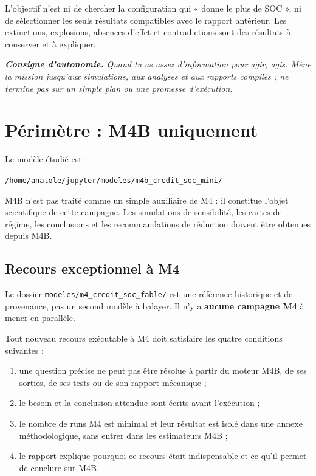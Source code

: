 \documentclass[11pt,a4paper]{article}
\newcommand{\file}[1]{\nolinkurl{#1}}
\newcommand{\term}[1]{\textbf{\color{navy}#1}}
\newenvironment{notebox}
  {\begin{center}\begin{minipage}{0.90\textwidth}\color{navy}\itshape}
  {\end{minipage}\end{center}}
\begin{document}
L'objectif n'est ni de chercher la configuration qui « donne le plus de SOC »,
ni de sélectionner les seuls résultats compatibles avec le rapport antérieur.
Les extinctions, explosions, absences d'effet et contradictions sont des
résultats à conserver et à expliquer.

\begin{notebox}
\textbf{Consigne d'autonomie.} Quand tu as assez d'information pour agir,
agis. Mène la mission jusqu'aux simulations, aux analyses et aux rapports
compilés ; ne termine pas sur un simple plan ou une promesse d'exécution.
\end{notebox}

\section{Périmètre : M4B uniquement}

Le modèle étudié est :

\begin{center}
  \file{/home/anatole/jupyter/modeles/m4b_credit_soc_mini/}
\end{center}

M4B n'est pas traité comme un simple auxiliaire de M4 : il constitue l'objet
scientifique de cette campagne. Les simulations de sensibilité, les cartes de
régime, les conclusions et les recommandations de réduction doivent être
obtenues depuis M4B.

\subsection{Recours exceptionnel à M4}

Le dossier \file{modeles/m4_credit_soc_fable/} est une référence historique et de
provenance, pas un second modèle à balayer. Il n'y a \term{aucune campagne M4}
à mener en parallèle.

Tout nouveau recours exécutable à M4 doit satisfaire les quatre conditions
suivantes :

\begin{enumerate}
  \item une question précise ne peut pas être résolue à partir du moteur M4B,
    de ses sorties, de ses tests ou de son rapport mécanique ;
  \item le besoin et la conclusion attendue sont écrits avant l'exécution ;
  \item le nombre de runs M4 est minimal et leur résultat est isolé dans une
    annexe méthodologique, sans entrer dans les estimateurs M4B ;
  \item le rapport explique pourquoi ce recours était indispensable et ce
    qu'il permet de conclure sur M4B.
\end{enumerate}
\end{document}

